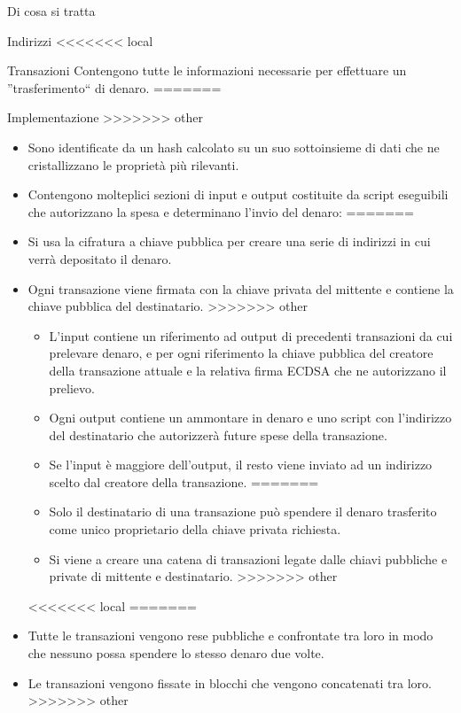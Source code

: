 \documentclass[italian]{beamer}
\begin{document}
\begin{frame}{Di cosa si tratta}
\begin{frame}{Indirizzi}
<<<<<<< local
\begin{frame}{Transazioni} %
Contengono tutte le informazioni necessarie per effettuare un ''trasferimento`` di denaro.
=======
\begin{frame}{Implementazione}
>>>>>>> other
\begin{itemize}
<<<<<<< local
 \item Sono identificate da un hash calcolato su un suo sottoinsieme di dati che ne cristallizzano le proprietà più rilevanti.
 \item Contengono molteplici sezioni di input e output costituite da script eseguibili che autorizzano la spesa e determinano l'invio del denaro:
=======
 \item Si usa la cifratura a chiave pubblica per creare una serie di indirizzi in cui verrà depositato il denaro.
 \item Ogni transazione viene firmata con la chiave privata del mittente e contiene la chiave pubblica del destinatario.
>>>>>>> other
 \begin{itemize}
<<<<<<< local
  \item L'input contiene un riferimento ad output di precedenti transazioni da cui prelevare denaro, e per ogni riferimento la chiave pubblica del creatore della transazione attuale e la relativa firma ECDSA che ne autorizzano il prelievo.
  \item Ogni output contiene un ammontare in denaro e uno script con l'indirizzo del destinatario che autorizzerà future spese della transazione.
  \item Se l'input è maggiore dell'output, il resto viene inviato ad un indirizzo scelto dal creatore della transazione.
=======
    \item Solo il destinatario di una transazione può spendere il denaro trasferito come unico proprietario della chiave privata richiesta.
    \item Si viene a creare una catena di transazioni legate dalle chiavi pubbliche e private di mittente e destinatario.
>>>>>>> other
 \end{itemize}
<<<<<<< local
=======
 \item Tutte le transazioni vengono rese pubbliche e confrontate tra loro in modo che nessuno possa spendere lo stesso denaro due volte.
 \item Le transazioni vengono fissate in blocchi che vengono concatenati tra loro.
>>>>>>> other
\end{itemize}
\end{frame}


\end{frame}
\end{frame}
\end{frame}
\end{document}

